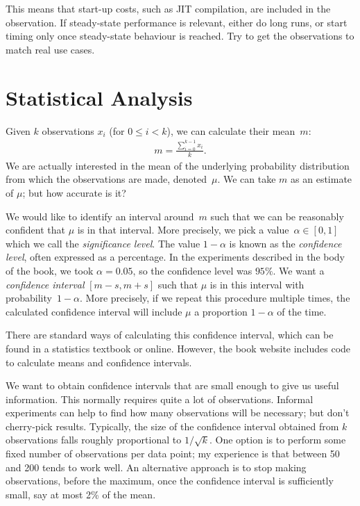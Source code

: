 This means that start-up costs, such as JIT compilation, are included in the
observation.  If steady-state performance is relevant, either do long runs, or
start timing only once steady-state behaviour is reached.  Try to get the
observations to match real use cases.


\section{Statistical Analysis}

Given $k$ observations $x_i$ (for $0 \le i < k$), we can calculate their
mean~$m$:
%
\begin{eqnarray*}
m = \frac{\sum_{i = 0}^{k-1} x_i}{k}.
\end{eqnarray*}
%
We are actually interested in the mean of the underlying probability
distribution from which the observations are made, denoted~$\mu$.  
%
We can take $m$ as an estimate of $\mu$; but how accurate is it?

We would like to identify an interval around~$m$ such that we can be
reasonably confident that $\mu$ is in that interval.
%
More precisely, we pick a value~$\alpha \in [0,1]$ which we call the
\emph{significance level}.  The value $1-\alpha$ is
known as the \emph{confidence level}, often expressed
as a percentage.  In the experiments described in the body of the book, we
took $\alpha = 0.05$, so the confidence level was $95\%$.  We want a
\emph{confidence interval} $[m-s, m+s]$ such that
$\mu$ is in this interval with probability~$1-\alpha$.
%
More precisely, if we repeat this procedure multiple times, the calculated
confidence interval will include $\mu$ a proportion $1-\alpha$ of the time. 

There are standard ways of calculating this confidence interval, which can be
found in a statistics textbook or online.  However, the book website includes
code to calculate means and confidence intervals. 

We want to obtain confidence intervals that are small enough to give us useful
information.  This normally requires quite a lot of observations.  Informal
experiments can help to find how many observations will be necessary; but
don't cherry-pick results.  Typically, the size of the confidence interval
obtained from $k$ observations falls roughly proportional to $1/\sqrt{k}$.
One option is to perform some fixed number of observations per data point; my
experience is that between 50 and 200 tends to work well.  An alternative
approach is to stop making observations, before the maximum, once the
confidence interval is sufficiently small, say at most 2\% of the mean.

